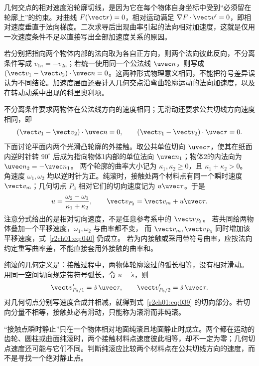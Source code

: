 几何交点的相对速度沿轮廓切线，是因为它在每个物体自身坐标中受到“必须留在轮廓上”的约束。对曲线 $F(\vect r)=0$，相对运动满足
$\nabla F\cdot\vect v'=0$，即相对速度垂直于法向梯度。二次求导后出现曲率引起的法向相对加速度，这就是仅用一次速度条件不足以直接写出全部加速度关系的原因。

若分别把指向两个物体内部的法向取为各自正方向，则两个法向彼此反向，不分离条件写成 $v_{1n}=-v_{2n}$；若统一使用同一个公法线 $\uvec n$，则写成
$(\vect v_1-\vect v_2)\cdot\uvec n=0$。这两种形式物理意义相同，不能把符号差异误认为不同结论。加速度层面还要计入几何交点沿弯曲轮廓运动的法向加速度，以及在转动动系中出现的科里奥利项。

不分离条件要求两物体在公法线方向的速度相同；无滑动还要求公共切线方向速度相同，即
\begin{equation}
  (\vect v_1-\vect v_2)\cdot\uvec n=0,
  \qquad
  (\vect v_1-\vect v_2)\cdot\uvec\tau=0.
  \label{r2ch01:eq:039}
\end{equation}
下面讨论平面内两个光滑凸轮廓的外接触。取公共单位切向 $\uvec\tau$，使其在纸面内逆时针转
$90^\circ$ 后成为指向物体1内部的单位法向 $\uvec n_1$；物体2的内法向为 $\uvec n_2=-\uvec n_1$。
两个轮廓的曲率大小记为 $\kappa_1,\kappa_2\geq0$，且 $\kappa_1+\kappa_2>0$。
角速度 $\omega_1,\omega_2$ 均以逆时针为正。纯滚时，接触处两个材料点有同一个瞬时速度
$\vect v_m$；几何切点 $P_3$ 相对它们的切向速度记为 $u\uvec\tau$。于是
\begin{equation}
  u=\frac{\omega_2-\omega_1}{\kappa_1+\kappa_2},\qquad
  \vect v_{P_3}=\vect v_m+u\uvec\tau.
  \label{r2ch01:eq:040}
\end{equation}
注意分式给出的是相对切向速度，不是任意参考系中的 $\vect v_{P_3}$。
若共同给两物体叠加一个平移速度，$\omega_1,\omega_2$ 与曲率都不变，
而 $\vect v_m,\vect v_{P_3}$ 同时增加该平移速度，式~\eqref{r2ch01:eq:040} 仍成立。
若为内接触或采用带符号曲率，应按法向约定重写曲率差，不能直接套用外接触的曲率和。

纯滚的几何定义是：接触过程中，两物体轮廓滚过的弧长相等，没有相对滑动。
用同一空间切向规定带符号弧长，令 $u=\dot s$，则
\[
  \vect v'_{P_3/1}=\dot s\,\uvec\tau,\qquad
  \vect v'_{P_3/2}=\dot s\,\uvec\tau.
\]
对几何切点分别写速度合成并相减，就得到式~\eqref{r2ch01:eq:039} 的切向部分。若切向分量不相等，接触处必有滑动，只能称为滚滑而非纯滚。

“接触点瞬时静止”只在一个物体相对地面纯滚且地面静止时成立。两个都在运动的齿轮、圆柱或曲面纯滚时，两个接触材料点速度彼此相等，却不一定为零；几何切点速度还可能与它们不同。判断纯滚应比较两个材料点在公共切线方向的速度，而不是寻找一个绝对静止点。

